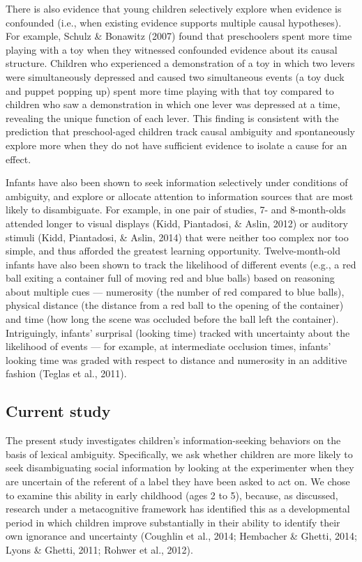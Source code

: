 \documentclass[english,man]{apa6}
\theoremstyle{definition}
\theoremstyle{definition}
\theoremstyle{definition}
\theoremstyle{remark}
\begin{document}
There is also evidence that young children selectively explore when
evidence is confounded (i.e., when existing evidence supports multiple
causal hypotheses). For example, Schulz \& Bonawitz (2007) found that
preschoolers spent more time playing with a toy when they witnessed
confounded evidence about its causal structure. Children who experienced
a demonstration of a toy in which two levers were simultaneously
depressed and caused two simultaneous events (a toy duck and puppet
popping up) spent more time playing with that toy compared to children
who saw a demonstration in which one lever was depressed at a time,
revealing the unique function of each lever. This finding is consistent
with the prediction that preschool-aged children track causal ambiguity
and spontaneously explore more when they do not have sufficient evidence
to isolate a cause for an effect.

Infants have also been shown to seek information selectively under
conditions of ambiguity, and explore or allocate attention to
information sources that are most likely to disambiguate. For example,
in one pair of studies, 7- and 8-month-olds attended longer to visual
displays (Kidd, Piantadosi, \& Aslin, 2012) or auditory stimuli (Kidd,
Piantadosi, \& Aslin, 2014) that were neither too complex nor too
simple, and thus afforded the greatest learning opportunity.
Twelve-month-old infants have also been shown to track the likelihood of
different events (e.g., a red ball exiting a container full of moving
red and blue balls) based on reasoning about multiple cues ---
numerosity (the number of red compared to blue balls), physical distance
(the distance from a red ball to the opening of the container) and time
(how long the scene was occluded before the ball left the container).
Intriguingly, infants' surprisal (looking time) tracked with uncertainty
about the likelihood of events --- for example, at intermediate
occlusion times, infants' looking time was graded with respect to
distance and numerosity in an additive fashion (Teglas et al., 2011).

\subsection{Current study}\label{current-study}

The present study investigates children's information-seeking behaviors
on the basis of lexical ambiguity. Specifically, we ask whether children
are more likely to seek disambiguating social information by looking at
the experimenter when they are uncertain of the referent of a label they
have been asked to act on. We chose to examine this ability in early
childhood (ages 2 to 5), because, as discussed, research under a
metacognitive framework has identified this as a developmental period in
which children improve substantially in their ability to identify their
own ignorance and uncertainty (Coughlin et al., 2014; Hembacher \&
Ghetti, 2014; Lyons \& Ghetti, 2011; Rohwer et al., 2012).
\end{document}
